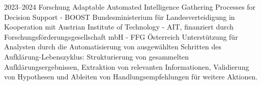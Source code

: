 \cventry
{2023--2024}
{Forschung}
{Adaptable Automated Intelligence Gathering Processes for Decision Support - BOOST}
{
  Bundesministerium für Landesverteidigung
  in Kooperation mit Austrian Institute of Technology - AIT,
  finanziert durch Forschungsförderungsgesellschaft mbH - FFG
}
{Österreich}
{
  Unterstützung für Analysten durch die Automatisierung von ausgewählten Schritten des
  Aufklärung-Lebenszyklus: Strukturierung von gesammelten Aufklärungsergebnissen, Extraktion von
  relevanten Informationen, Validierung von Hypothesen und Ableiten von Handlungsempfehlungen
  für weitere Aktionen.
}
